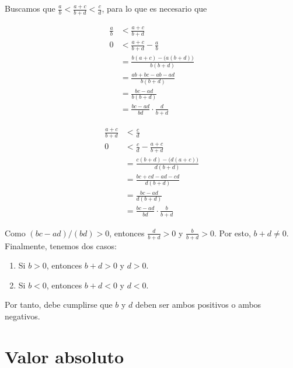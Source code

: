 \documentclass[11pt]{article}
\newcommand{\R}{\mathbb{R}}
\newcommand{\bfit}[1]{\textbf{\textit{#1}}}
\let\set\Set
\begin{document}
\begin{enumerate}[label=\alph*)]
    Buscamos que $\frac{a}{b}<\frac{a+c}{b+d}<\frac{c}{d}$, para lo que es necesario que
    \begin{center}%
    \begin{minipage}[l]{.5\linewidth}
    \begin{align*}
        \frac{a}{b} &< \frac{a+c}{b+d}\\
        0 &< \frac{a+c}{b+d} - \frac{a}{b}\\
        &= \frac{b(a+c)-\bigl(a(b+d)\bigr)}{b(b+d)}\\
        &= \frac{ab+bc-ab-ad}{b(b+d)}\\
        &= \frac{bc-ad}{b(b+d)}\\
        &= \frac{bc-ad}{bd} \cdot \frac{d}{b+d}
    \end{align*}
    \end{minipage}%
    \begin{minipage}[r]{.5\linewidth}
    \begin{align*}
        \frac{a+c}{b+d} &< \frac{c}{d}\\
        0 &< \frac{c}{d} -\frac{a+c}{b+d}\\
        &= \frac{c(b+d)-\bigl(d(a+c)\bigr)}{d(b+d)}\\
        &= \frac{bc+cd-ad-cd}{d(b+d)}\\
        &= \frac{bc-ad}{d(b+d)}\\
        &= \frac{bc-ad}{bd} \cdot \frac{b}{b+d}
    \end{align*}
    \end{minipage}
    \end{center}
    Como $(bc-ad)/(bd)>0$, entonces $\frac{d}{b+d}>0$ y $\frac{b}{b+d}>0$. Por esto, $b+d\neq 0$. Finalmente, tenemos dos casos: \begin{enumerate}[label=\roman*)]
        \item Si $b>0$, entonces $b+d>0$ y $d>0$.
        \item Si $b<0$, entonces $b+d<0$ y $d<0$.
    \end{enumerate}

    Por tanto, debe cumplirse que $b$ y $d$ deben ser ambos positivos o ambos negativos.

\end{enumerate}

\pagebreak

\section*{Valor absoluto}
\end{document}
